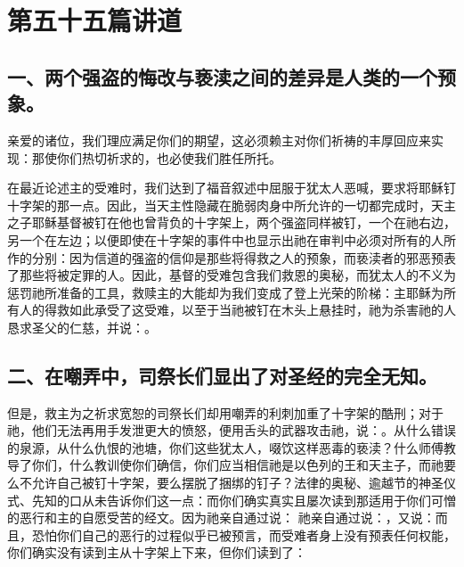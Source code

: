 
\section{第五十五篇讲道}

\par


\subsection{一、两个强盗的悔改与亵渎之间的差异是人类的一个预象。}

亲爱的诸位，我们理应满足你们的期望，这必须赖主对你们祈祷的丰厚回应来实现：那使你们热切祈求的，也必使我们胜任所托。\par

在最近论述主的受难时，我们达到了福音叙述中屈服于犹太人恶喊，要求将耶稣钉十字架的那一点。因此，当天主性隐藏在脆弱肉身中所允许的一切都完成时，天主之子耶稣基督被钉在他也曾背负的十字架上，两个强盗同样被钉，一个在祂右边，另一个在左边；以便即使在十字架的事件中也显示出祂在审判中必须对所有的人所作的分别：因为信道的强盗的信仰是那些将得救之人的预象，而亵渎者的邪恶预表了那些将被定罪的人。因此，基督的受难包含我们救恩的奥秘，而犹太人的不义为惩罚祂所准备的工具，救赎主的大能却为我们变成了登上光荣的阶梯：主耶稣为所有人的得救如此承受了这受难，以至于当祂被钉在木头上悬挂时，祂为杀害祂的人恳求圣父的仁慈，并说：。\par


\subsection{二、在嘲弄中，司祭长们显出了对圣经的完全无知。}

但是，救主为之祈求宽恕的司祭长们却用嘲弄的利刺加重了十字架的酷刑；对于祂，他们无法再用手发泄更大的愤怒，便用舌头的武器攻击祂，说：。从什么错误的泉源，从什么仇恨的池塘，你们这些犹太人，啜饮这样恶毒的亵渎？什么师傅教导了你们，什么教训使你们确信，你们应当相信祂是以色列的王和天主子，而祂要么不允许自己被钉十字架，要么摆脱了捆绑的钉子？法律的奥秘、逾越节的神圣仪式、先知的口从未告诉你们这一点：而你们确实真实且屡次读到那适用于你们可憎的恶行和主的自愿受苦的经文。因为祂亲自通过说： 祂亲自通过说：，又说：而且，恐怕你们自己的恶行的过程似乎已被预言，而受难者身上没有预表任何权能，你们确实没有读到主从十字架上下来，但你们读到了：\par

